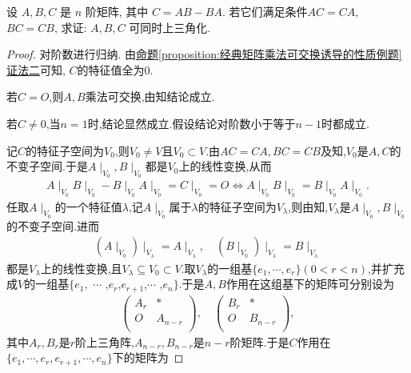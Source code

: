 \documentclass[../../main.tex]{subfiles}%
\begin{document}
\begin{corollary}\label{proposition:经典矩阵乘法可交换诱导的性质例题推论}
设 \(A, B, C\) 是 \(n\) 阶矩阵, 其中 \(C = AB - BA\). 若它们满足条件$AC = CA,$  $BC = CB$, 求证: \(A,B,C\) 可同时上三角化.
\end{corollary}
\begin{proof}

对阶数进行归纳. 由\hyperref[proposition:经典矩阵乘法可交换诱导的性质例题]{命题\ref{proposition:经典矩阵乘法可交换诱导的性质例题}证法二}可知, \(C\)的特征值全为\(0\).

若$C=O$,则$A,B$乘法可交换,由知结论成立.

若$C\ne 0$,当$n=1$时,结论显然成立.假设结论对阶数小于等于$n-1$时都成立.

记$C$的特征子空间为$V_0$,则$V_0\ne V$且$V_0\subset V$.由$AC=CA,BC=CB$及知,$V_0$是$A,C$的不变子空间.于是$A\mid_{V_0}^{},B\mid_{V_0}^{}$都是$V_0$上的线性变换,从而
\begin{align*}
A\mid_{V_0}^{}B\mid_{V_0}^{}-B\mid_{V_0}^{}A\mid_{V_0}^{}=C\mid_{V_0}^{}=O\Longleftrightarrow A\mid_{V_0}^{}B\mid_{V_0}^{}=B\mid_{V_0}^{}A\mid_{V_0}^{}.
\end{align*}
任取$A\mid_{V_0}^{}$的一个特征值$\lambda$,记$A\mid_{V_0}^{}$属于$\lambda$的特征子空间为$V_{\lambda}$,则由知,$V_{\lambda}$是$A\mid_{V_0}^{},B\mid_{V_0}^{}$的不变子空间.进而
\begin{align*}
\left( A\mid_{V_0}^{} \right) \mid_{V_{\lambda}}^{}=A\mid_{V_{\lambda}}^{},\quad \left( B\mid_{V_0}^{} \right) \mid_{V_{\lambda}}^{}=B\mid_{V_{\lambda}}^{}
\end{align*}
都是$V_{\lambda}$上的线性变换,且$V_{\lambda}\subseteq V_0\subset V$.取$V_{\lambda}$的一组基$\{ e_1,\cdots ,e_r \} \left( 0<r<n \right)$,并扩充成$V$的一组基$\{ e_1,$ $\cdots$ ,$e_r$,$e_{r+1}$,$\cdots$ ,$e_n \}$.于是$A,B$作用在这组基下的矩阵可分别设为
\begin{align*}
\begin{pmatrix}
A_r&		*\\
O&		A_{n-r}\\
\end{pmatrix},\quad \begin{pmatrix}
B_r&		*\\
O&		B_{n-r}\\
\end{pmatrix},
\end{align*}
其中$A_r,B_r$是$r$阶上三角阵,$A_{n-r},B_{n-r}$是$n-r$阶矩阵.于是$C$作用在$\{ e_1,\cdots ,e_r,e_{r+1},\cdots ,e_n \}$下的矩阵为

\end{proof}
\end{document}
